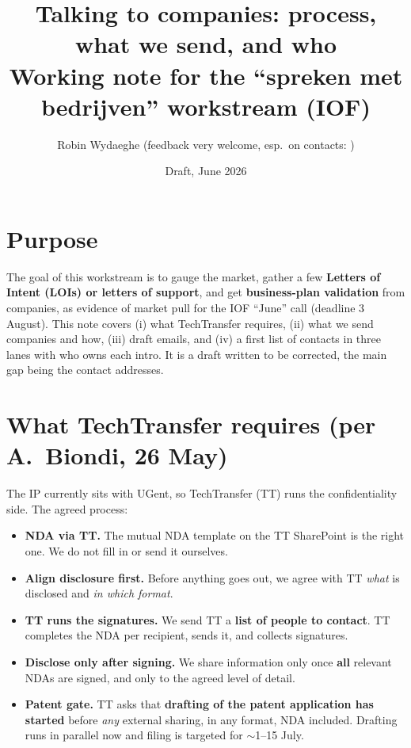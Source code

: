 \documentclass[11pt,a4paper]{article}
\title{\vspace{-1.5em}Talking to companies: process, what we send, and who\\[-0.2em]
\large Working note for the ``spreken met bedrijven'' workstream (IOF)}
\author{Robin Wydaeghe \quad (feedback very welcome, esp.\ on contacts: \owner{Luc} \owner{Wout})}
\date{Draft, June 2026}
\begin{document}
\maketitle
\vspace{-1.5em}

\section{Purpose}
The goal of this workstream is to gauge the market, gather a few \textbf{Letters of Intent (LOIs) or
letters of support}, and get \textbf{business-plan validation} from companies, as evidence of market pull
for the IOF ``June'' call (deadline 3 August). This note covers (i) what TechTransfer requires, (ii) what we
send companies and how, (iii) draft emails, and (iv) a first list of contacts in three lanes with who owns
each intro. It is a draft written to be corrected, the main gap being the contact addresses.

\section{What TechTransfer requires (per A.\ Biondi, 26 May)}
The IP currently sits with UGent, so TechTransfer (TT) runs the confidentiality side. The agreed process:
\begin{itemize}
  \item \textbf{NDA via TT.} The mutual NDA template on the TT SharePoint is the right one. We do not fill in or send it ourselves.
  \item \textbf{Align disclosure first.} Before anything goes out, we agree with TT \emph{what} is disclosed and \emph{in which format}.
  \item \textbf{TT runs the signatures.} We send TT a \textbf{list of people to contact}. TT completes the NDA per recipient, sends it, and collects signatures.
  \item \textbf{Disclose only after signing.} We share information only once \textbf{all} relevant NDAs are signed, and only to the agreed level of detail.
  \item \textbf{Patent gate.} TT asks that \textbf{drafting of the patent application has started} before \emph{any} external sharing, in any format, NDA included. Drafting runs in parallel now and filing is targeted for $\sim$1--15 July.
\end{itemize}
\end{document}

